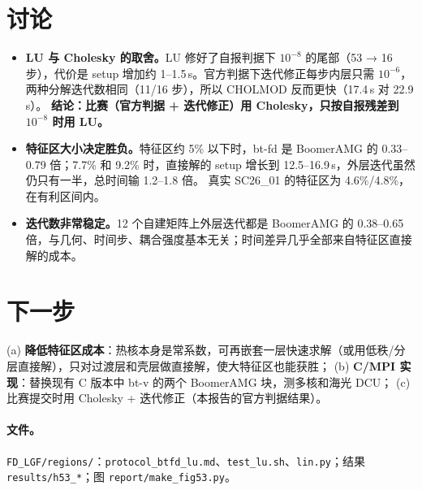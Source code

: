 \documentclass[11pt,a4paper]{ctexart}
\begin{document}
\section{讨论}
\begin{itemize}
\item \textbf{LU 与 Cholesky 的取舍。}LU 修好了自报判据下 $10^{-8}$ 的尾部（53 → 16 步），代价是 setup 增加约 1--1.5\,s。官方判据下迭代修正每步内层只需 $10^{-6}$，两种分解迭代数相同（11/16 步），所以 CHOLMOD 反而更快（17.4\,s 对 22.9\,s）。
\textbf{结论：比赛（官方判据 + 迭代修正）用 Cholesky，只按自报残差到 $10^{-8}$ 时用 LU。}
\item \textbf{特征区大小决定胜负。}特征区约 5\% 以下时，bt-fd 是 BoomerAMG 的 0.33--0.79 倍；7.7\% 和 9.2\% 时，直接解的 setup 增长到 12.5--16.9\,s，外层迭代虽然仍只有一半，总时间输 1.2--1.8 倍。
真实 SC26\_01 的特征区为 4.6\%/4.8\%，在有利区间内。
\item \textbf{迭代数非常稳定。}12 个自建矩阵上外层迭代都是 BoomerAMG 的 0.38--0.65 倍，与几何、时间步、耦合强度基本无关；时间差异几乎全部来自特征区直接解的成本。
\end{itemize}

\section{下一步}
(a) \textbf{降低特征区成本}：热核本身是常系数，可再嵌套一层快速求解（或用低秩/分层直接解），只对过渡层和壳层做直接解，使大特征区也能获胜；
(b) \textbf{C/MPI 实现}：替换现有 C 版本中 bt-v 的两个 BoomerAMG 块，测多核和海光 DCU；
(c) 比赛提交时用 Cholesky + 迭代修正（本报告的官方判据结果）。

\paragraph{文件。}\sloppy \texttt{FD\_LGF/regions/}：\texttt{protocol\_btfd\_lu.md}、\texttt{test\_lu.sh}、\texttt{lin.py}；结果 \texttt{results/h53\_*}；图 \texttt{report/make\_fig53.py}。
\end{document}
